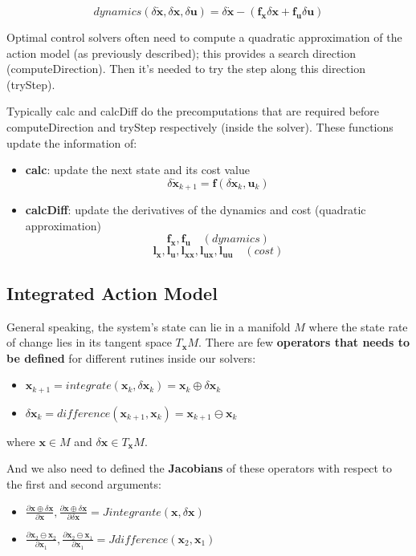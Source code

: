 $$
dynamics(\delta\mathbf{\dot{x}},\delta\mathbf{x},\delta\mathbf{u}) = \delta\mathbf{\dot{x}} - (\mathbf{f_x}\delta\mathbf{x} + \mathbf{f_u}\delta\mathbf{u})
$$

Optimal control solvers often need to compute a quadratic approximation of the action model (as previously described); this provides a search direction (computeDirection). Then it's needed to try the step along this direction (tryStep).

Typically calc and calcDiff do the precomputations that are required before computeDirection and tryStep respectively (inside the solver). These functions update the information of:
\begin{itemize}
\item \textbf{calc}: update the next state and its cost value
 $$\delta\mathbf{\dot{x}}_{k+1} = \mathbf{f}(\delta\mathbf{x}_k,\mathbf{u}_k)$$
\item \textbf{calcDiff}: update the derivatives of the dynamics and cost (quadratic approximation)
 $$\mathbf{f_x}, \mathbf{f_u} \hspace{1em} (dynamics)$$
 $$\mathbf{l_x}, \mathbf{l_u}, \mathbf{l_{xx}}, \mathbf{l_{ux}}, \mathbf{l_{uu}} \hspace{1em} (cost)$$
\end{itemize}
 
\subsection{Integrated Action Model}
General speaking, the system's state can lie in a manifold $M$ where the state rate of change lies in its tangent space $T_\mathbf{x}M$. There are few \textbf{operators that needs to be defined} for different rutines inside our solvers:
\begin{itemize}
\item$\mathbf{x}_{k+1} = integrate(\mathbf{x}_k,\delta\mathbf{x}_k) = \mathbf{x}_k \oplus \delta\mathbf{x}_k$
\item$\delta\mathbf{x}_k = difference(\mathbf{x}_{k+1},\mathbf{x}_k) = \mathbf{x}_{k+1} \ominus \mathbf{x}_k$
\end{itemize}

where $\mathbf{x}\in M$ and $\delta\mathbf{x}\in T_\mathbf{x} M$.
 
And we also need to defined the \textbf{Jacobians} of these operators with respect to the first and second arguments:
\begin{itemize}
\item $\frac{\partial \mathbf{x}\oplus\delta\mathbf{x}}{\partial \mathbf{x}}, \frac{\partial \mathbf{x}\oplus\delta\mathbf{x}}{\partial\delta\mathbf{x}} =Jintegrante(\mathbf{x},\delta\mathbf{x})$
\item $\frac{\partial\mathbf{x}_2\ominus\mathbf{x}_2}{\partial \mathbf{x}_1}, \frac{\partial \mathbf{x}_2\ominus\mathbf{x}_1}{\partial\mathbf{x}_1} =Jdifference(\mathbf{x}_2,\mathbf{x}_1)$
\end{itemize}

